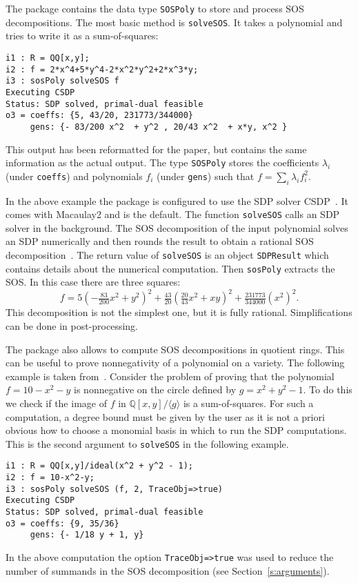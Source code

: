 \documentclass[11pt]{amsart}
\theoremstyle{plain}%
\theoremstyle{definition}
\theoremstyle{remark}
\newcommand{\Mac}{Macaulay2\xspace}
\newcommand{\QQ}{\mathbb{Q}}
\begin{document}
The package contains the data type \verb|SOSPoly| to store and process SOS decompositions.
The most basic method is \verb|solveSOS|.
It takes a polynomial and tries to write it as a sum-of-squares:
{\small
\begin{verbatim}
i1 : R = QQ[x,y];
i2 : f = 2*x^4+5*y^4-2*x^2*y^2+2*x^3*y;
i3 : sosPoly solveSOS f
Executing CSDP
Status: SDP solved, primal-dual feasible
o3 = coeffs: {5, 43/20, 231773/344000}
     gens: {- 83/200 x^2  + y^2 , 20/43 x^2  + x*y, x^2 }
\end{verbatim}
}
\noindent
This output has been reformatted for the paper, but contains the same information as the actual output.
The type \verb|SOSPoly| stores the coefficients $\lambda_{i}$ (under \verb|coeffs|) and polynomials $f_{i}$ (under \verb|gens|) such that $f = \sum_{i}\lambda_{i}f_{i}^{2}$.

In the above example the package is configured to use the SDP solver CSDP~\cite{borchers1999csdp}.
It comes with \Mac and is the default.
The function \verb|solveSOS| calls an SDP solver in the background.
The SOS decomposition of the input polynomial solves an SDP numerically and then rounds the result to obtain a rational SOS decomposition~\cite{peyrl2008computing}.
The return value of \verb|solveSOS| is an object \verb|SDPResult| which contains details about the numerical computation.
Then \verb|sosPoly| extracts the SOS.
In this case there are three squares:
\[
  f = 5(-\tfrac{83}{200} x^{2}+y^{2})^{2} + \tfrac{43}{20}
  (\tfrac{20}{43}x^{2} + xy)^{2} + \tfrac{231773}{344000} (x^{2})^{2}.
\]
This decomposition is not the simplest one, but it is fully rational.
Simplifications can be done in post-processing.

The package also allows to compute SOS decompositions in quotient rings.
This can be useful to prove nonnegativity of a polynomial on a variety.
The following example is taken from~\cite{parrilo2005exploiting}.
Consider the problem of proving that the polynomial $f = 10{-}x^2{-}y$ is nonnegative on the circle defined by $g = x^2 {+} y^2 {-} 1$.
To do this we check if the image of $f$ in $\QQ[x,y]/\langle g\rangle$ is a sum-of-squares.
For such a computation, a degree bound must be given by the user as it is not a priori obvious how to choose a monomial basis in which to run the SDP computations.
This is the second argument to \verb|solveSOS| in the following example.
{\small
\begin{verbatim}
i1 : R = QQ[x,y]/ideal(x^2 + y^2 - 1);
i2 : f = 10-x^2-y;
i3 : sosPoly solveSOS (f, 2, TraceObj=>true)
Executing CSDP
Status: SDP solved, primal-dual feasible
o3 = coeffs: {9, 35/36}
     gens: {- 1/18 y + 1, y}
\end{verbatim}
}
\noindent
In the above computation the option \verb|TraceObj=>true| was used to reduce the number of summands in the SOS decomposition (see Section~\ref{s:arguments}).
\end{document}

